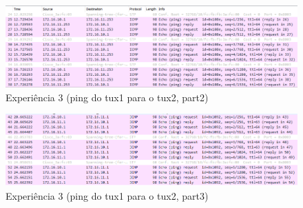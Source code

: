 \documentclass{article}
\begin{document}
\begin{figure}[H]
    \centering
    \includegraphics[scale=0.5]{images/exp3_part2.PNG}
    \caption{Experiência 3 (ping do tux1 para o tux2, part2)}
\end{figure}
\begin{figure}[H]
    \centering
    \includegraphics[scale=0.5]{images/exp3_part3.PNG}
    \caption{Experiência 3 (ping do tux1 para o tux2, part3)}
\end{figure}
\end{document}
